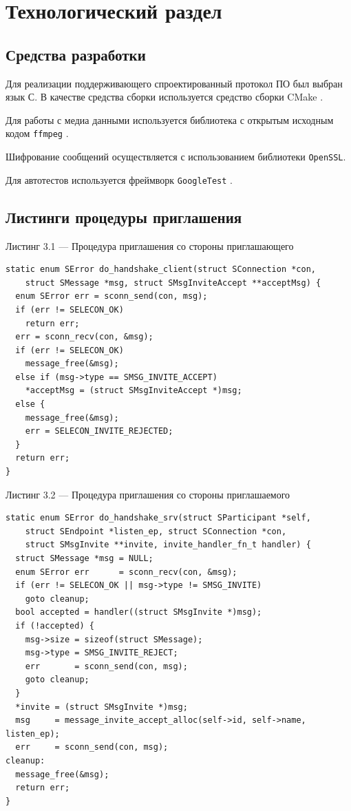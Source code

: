 \chapter{Технологический раздел}

\section{Средства разработки}

Для реализации поддерживающего спроектированный протокол ПО был выбран язык С.
В качестве средства сборки используется средство сборки CMake \cite{cmake}.

Для работы с медиа данными используется библиотека с открытым исходным кодом \texttt{ffmpeg} \cite{ffmpeg}.

Шифрование сообщений осуществляется с использованием библиотеки \texttt{OpenSSL}.

Для автотестов используется фреймворк \texttt{GoogleTest} \cite{gtest}.

\section{Листинги процедуры приглашения}

\noindent
Листинг 3.1 --- Процедура приглашения со стороны приглашающего

{\fontsize{11pt}{2pt}\selectfont
\begin{verbatim}
static enum SError do_handshake_client(struct SConnection *con,
    struct SMessage *msg, struct SMsgInviteAccept **acceptMsg) {
  enum SError err = sconn_send(con, msg);
  if (err != SELECON_OK)
    return err;
  err = sconn_recv(con, &msg);
  if (err != SELECON_OK)
    message_free(&msg);
  else if (msg->type == SMSG_INVITE_ACCEPT)
    *acceptMsg = (struct SMsgInviteAccept *)msg;
  else {
    message_free(&msg);
    err = SELECON_INVITE_REJECTED;
  }
  return err;
}
\end{verbatim}}

\noindent
Листинг 3.2 --- Процедура приглашения со стороны приглашаемого

{\fontsize{11pt}{9pt}\selectfont
\begin{verbatim}
static enum SError do_handshake_srv(struct SParticipant *self,
    struct SEndpoint *listen_ep, struct SConnection *con,
    struct SMsgInvite **invite, invite_handler_fn_t handler) {
  struct SMessage *msg = NULL;
  enum SError err      = sconn_recv(con, &msg);
  if (err != SELECON_OK || msg->type != SMSG_INVITE)
    goto cleanup;
  bool accepted = handler((struct SMsgInvite *)msg);
  if (!accepted) {
    msg->size = sizeof(struct SMessage);
    msg->type = SMSG_INVITE_REJECT;
    err       = sconn_send(con, msg);
    goto cleanup;
  }
  *invite = (struct SMsgInvite *)msg;
  msg     = message_invite_accept_alloc(self->id, self->name, listen_ep);
  err     = sconn_send(con, msg);
cleanup:
  message_free(&msg);
  return err;
}
\end{verbatim}}

